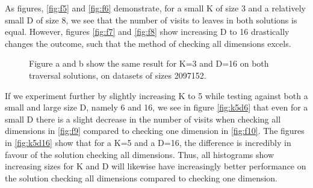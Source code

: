 As figures, \ref{fig:f5} and \ref{fig:f6}  demonstrate, for a small K of size 3 and a relatively small D of size 8, we see that the number of visits to leaves in both solutions is equal. However, figures \ref{fig:f7} and \ref{fig:f8}  show increasing D to 16 drastically changes the outcome, such that the method of checking all dimensions excels. 

\begin{figure}[H]
  \centering
  \caption{Figure a and b show the same result for K=3 and D=16 on both traversal solutions, on datasets of sizes 2097152.}
  \label{fig:k3d16}
\end{figure}


If we experiment further by slightly increasing K to 5 while testing against both a small and large size D, namely 6 and 16, we see in figure \ref{fig:k5d6} that even for a small D there is a slight decrease in the number of visits when checking all dimensions in \ref{fig:f9} compared to checking one dimension in \ref{fig:f10}. The figures in \ref{fig:k5d16} show that for a K=5 and a D=16, the difference is incredibly in favour of the solution checking all dimensions. Thus, all histograms show increasing sizes for K and D will likewise have increasingly better performance on the solution checking all dimensions compared to checking one dimension. 

